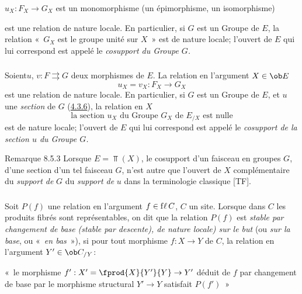 \documentclass[10pt]{../fichiers-configuration-latex/smfart}
\begin{document}
$u_X:F_X\rightarrow G_X$ est un monomorphisme (\resp un
épimorphisme, \resp un isomorphisme)

\noindent est une relation de nature locale. En particulier, si $G$
est un Groupe de $E$, la relation « $G_X$ est le groupe unité sur
$X$ » est de nature locale; l'ouvert de $E$ qui lui correspond est
appelé le \emph{cosupport du Groupe $G$.}

\subsubsection{}
Soient\pageoriginale $u$, $v:F\rightrightarrows G$ deux morphismes
de $E$. La relation en l'argument $X\in \ob E$
$$
u_X=v_X:F_X\longrightarrow G_X
$$
est une relation de nature locale. En particulier, si $G$ est un
Groupe de $E$, et $u$ une \emph{section} de $G$
(\hyperref[IV.subsubsec4.3.6]{4.3.6}), la relation en $X$
$$
\mbox{la section $u_X$ du Groupe $G_X$ de $E_{/X}$ est nulle}
$$
est de nature locale; l'ouvert de $E$ qui lui correspond est appelé
le \emph{cosupport de la section $u$ du Groupe $G$.}

\begin{enonce*}[remark]{Remarque 8.5.3}
Lorsque $E=\Top(X)$, le cosupport d'un faisceau en groupes $G$,
\resp d'une section d'un tel faisceau $G$, n'est autre que l'ouvert
de $X$ complémentaire du \emph{support de} $G$ \resp du
\emph{support de} $u$ dans la terminologie classique [TF].
\end{enonce*}

\setcounter{subsubsection}{3}
\subsubsection{}
Soit $P(f)$ une relation en l'argument $f\in {\rm f\ell\,} C$, $C$
un site. Lorsque dans $C$ les produits fibrés sont représentables,
on dit que la relation $P(f)$ est \emph{stable par changement de
base (\resp stable par descente), \resp de nature locale) sur le
but} (ou \emph{sur la base}, ou « \emph{en bas} »), si pour tout
morphisme $f:X\rightarrow Y$ de $C$, la relation en l'argument
$Y'\in \ob C_{/Y}$:

« le morphisme $f':X'=\fprod{X}{Y'}{Y}\rightarrow Y'$ déduit de
$f$ par changement de base par le morphisme structural
$Y'\rightarrow Y$ satisfait $P(f')$ »
\end{document}

